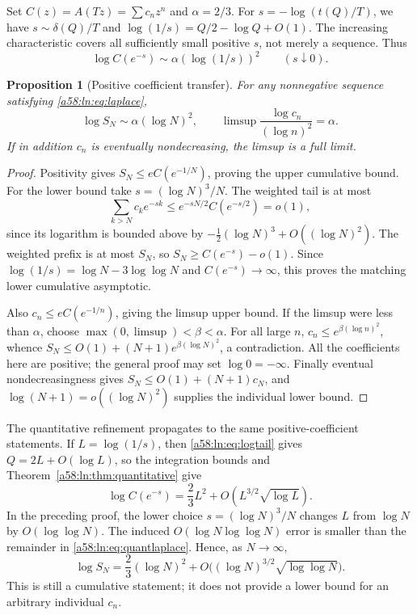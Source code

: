 \documentclass[11pt,letterpaper]{article}
\newtheorem{proposition}[theorem]{Proposition}
\theoremstyle{remark}
\begin{document}
Set $C(z)=A(Tz)=\sum c_nz^n$ and $\alpha=2/3$. For
$s=-\log(t(Q)/T)$, we have $s\sim\delta(Q)/T$ and
$\log(1/s)=Q/2-\log Q+O(1)$. The increasing characteristic covers all
sufficiently small positive $s$, not merely a sequence. Thus
\begin{equation}\label{a58:ln:eq:laplace}
 \log C(e^{-s})\sim\alpha(\log(1/s))^2\qquad(s\downarrow0).
\end{equation}

\begin{proposition}[Positive coefficient transfer]\label{a58:ln:prop:positivity}
For any nonnegative sequence satisfying \eqref{a58:ln:eq:laplace},
\[
 \log S_N\sim\alpha(\log N)^2,
 \qquad \limsup\frac{\log c_n}{(\log n)^2}=\alpha.
\]
If in addition $c_n$ is eventually nondecreasing, the limsup is a full
limit.
\end{proposition}
\begin{proof}
Positivity gives $S_N\le eC(e^{-1/N})$, proving the upper cumulative
bound. For the lower bound take $s=(\log N)^3/N$. The weighted tail is
at most
\[
 \sum_{k>N}c_ke^{-sk}\le e^{-sN/2}C(e^{-s/2})=o(1),
\]
since its logarithm is bounded above by
$-\tfrac12(\log N)^3+O((\log N)^2)$. The weighted prefix is at most
$S_N$, so $S_N\ge C(e^{-s})-o(1)$. Since
$\log(1/s)=\log N-3\log\log N$ and $C(e^{-s})\to\infty$, this
proves the matching lower cumulative asymptotic.

Also $c_n\le eC(e^{-1/n})$, giving the limsup upper bound. If the
limsup were less than $\alpha$, choose
$\max(0,\limsup)<\beta<\alpha$. For all large $n$,
$c_n\le e^{\beta(\log n)^2}$, whence
$S_N\le O(1)+(N+1)e^{\beta(\log N)^2}$, a contradiction. All the
coefficients here are positive; the general proof may set $\log0=-\infty$.
Finally eventual nondecreasingness gives
$S_N\le O(1)+(N+1)c_N$, and $\log(N+1)=o((\log N)^2)$ supplies the
individual lower bound.
\end{proof}

The quantitative refinement propagates to the same positive-coefficient
statements. If $L=\log(1/s)$, then \eqref{a58:ln:eq:logtail} gives
$Q=2L+O(\log L)$, so the integration bounds and
Theorem~\ref{a58:ln:thm:quantitative} give
\begin{equation}\label{a58:ln:eq:quantlaplace}
 \log C(e^{-s})=\frac23L^2+O(L^{3/2}\sqrt{\log L}).
\end{equation}
In the preceding proof, the lower choice $s=(\log N)^3/N$ changes $L$
from $\log N$ by $O(\log\log N)$. The induced
$O(\log N\log\log N)$ error is smaller than the remainder in
\eqref{a58:ln:eq:quantlaplace}. Hence, as $N\to\infty$,
\begin{equation}\label{a58:ln:eq:quantcum}
 \log S_N=\frac23(\log N)^2
       +O\bigl((\log N)^{3/2}\sqrt{\log\log N}\bigr).
\end{equation}
This is still a cumulative statement; it does not provide a lower bound
for an arbitrary individual $c_n$.
\end{document}
